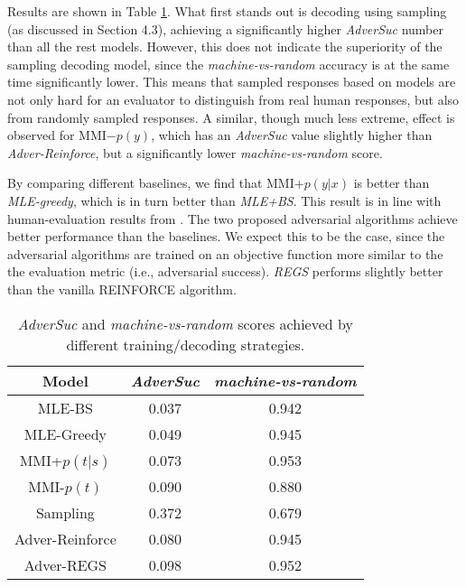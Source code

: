 Results are shown in Table \ref{adv}. What first stands out  is decoding using sampling (as discussed in Section 4.3), achieving a significantly higher {\it AdverSuc} number than all the rest models. 
However, this does not indicate the superiority of the sampling decoding model, since the {\it machine-vs-random} accuracy is at the same time significantly lower. This means that sampled responses based on \sts models are not only hard for an evaluator to distinguish from real human responses, but also from randomly sampled responses.
A similar, though much less extreme, effect is observed for MMI$-p(y)$, which has an {\it AdverSuc} value slightly higher than {\it Adver-Reinforce}, but a significantly lower {\it machine-vs-random} score. 

By comparing different baselines, we find that MMI+$p(y|x)$ is better than {\it MLE-greedy}, which is in turn better than {\it MLE+BS}. This result is in line with human-evaluation results from . 
The two proposed adversarial algorithms achieve better performance than the baselines. We expect this to be the case, since the adversarial algorithms are trained on an objective function 
more similar to the
the evaluation metric (i.e., adversarial success). 
{\it REGS} performs slightly better than the vanilla REINFORCE algorithm. 

\begin{table}
\small
\centering
\begin{tabular}{ccc}\toprule
Model&{\it AdverSuc}&{\it machine-vs-random} \\\midrule
MLE-BS&0.037&0.942 \\
MLE-Greedy&0.049&0.945 \\ 
MMI+$p(t|s)$&0.073&0.953\\
MMI-$p(t)$&0.090& 0.880\\
Sampling&0.372&0.679\\
Adver-Reinforce&0.080&0.945 \\
Adver-REGS&0.098&0.952\\\bottomrule
\end{tabular}
\caption{{\it AdverSuc} and {\it machine-vs-random} scores achieved by different training/decoding strategies.}
\label{adv}
\end{table}

